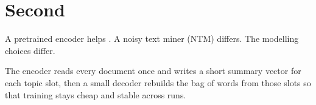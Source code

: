 \chapter{Second}
A pretrained encoder helps \cite{b}. A noisy text miner (NTM) differs.
The modelling choices differ.

The encoder reads every document once and writes a short summary vector for each topic slot, then a small decoder rebuilds the bag of words from those slots so that training stays cheap and stable across runs.
